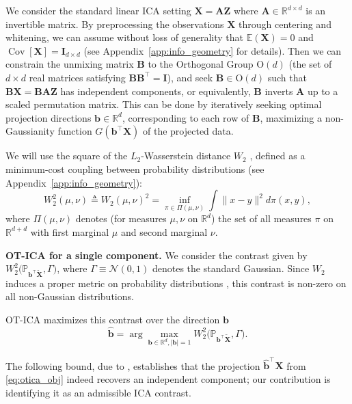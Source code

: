 \documentclass[accepted]{tpm2026} %
\newcommand{\Xb}{\mathbf{X}}
\newcommand{\Ab}{\mathbf{A}}
\newcommand{\Zb}{\mathbf{Z}}
\begin{document}
We consider the standard linear ICA setting $\Xb = \Ab\Zb$ where $\Ab\in \mathbb{R}^{d\times d}$ is an invertible matrix. By preprocessing the observations $\Xb$ through centering and whitening, we can assume without loss of generality that $\mathbb{E}(\mathbf{X})=0$ and $\operatorname{Cov}[{\mathbf{X}}] = \mathbf{I}_{d\times d}$ (see Appendix~\ref{app:info_geometry} for details). Then we can constrain the unmixing matrix $\mathbf{B}$ to the Orthogonal Group $\mathrm{O}(d)$ (the set of $d\times d$ real matrices satisfying $\mathbf{B}\mathbf{B}^\top = \mathbf{I}$), and seek $\mathbf{B}\in \mathrm{O}(d)$ such that $\mathbf{B}\Xb=\mathbf{B}\Ab\Zb$ has independent components, or equivalently, $\mathbf{B}$ inverts $\Ab$ up to a scaled permutation matrix. 
This can be done by iteratively seeking optimal projection directions
$\mathbf{b}\in\mathbb{R}^d$, corresponding to each row of
$\mathbf{B}$, maximizing a non-Gaussianity function $G(\mathbf{b}^\top \Xb)$ 
of the projected data. 

We will use the square of the $L_2$-Wasserstein distance $W_2$ \citep{villani2003}, 
defined as a minimum-cost coupling between probability distributions (see Appendix~\ref{app:info_geometry}):
\begin{equation}
    W_2^2(\mu, \nu) \!\triangleq\!W_2(\mu, \nu)^2\!=\!\!\!  \inf_{\pi \in \Pi(\mu, \nu)} \int\!\! \|x - y\|^2  d\pi(x, y) ,
\end{equation}
where $\Pi(\mu,\nu)$ denotes (for measures $\mu,\nu$ on $\mathbb{R}^d$) the set of all measures $\pi$ on $\mathbb{R}^{d+d}$ with first marginal $\mu$ and second marginal $\nu$.


\textbf{OT-ICA for a single component.}
We consider the contrast given by
$W_2^2\big(\mathbb{P}_{\mathbf{b}^\top \widetilde{\mathbf{X}}}, \Gamma\big)$, 
where $\Gamma \equiv \mathcal{N}(0,1)$ denotes the standard Gaussian.
Since  $W_2$ induces a proper metric on probability distributions \citep{villani2003}, this contrast  is non-zero on all non-Gaussian distributions.


OT-ICA maximizes this contrast over the direction $\mathbf{b}$
\begin{equation}
    \widehat{\mathbf{b}} = \arg\max_{\mathbf{b} \in \mathbb{R}^d, |\mathbf{b}|=1} W_2^2\big(\mathbb{P}_{\mathbf{b}^\top \widetilde{\mathbf{X}}}, \Gamma\big). \label{eq:otica_obj}
\end{equation}

The following bound, due to \citet{johnson2005central}, establishes that the projection $\widehat{\mathbf{b}}^\top \Xb$ from \eqref{eq:otica_obj} indeed recovers an independent component; our contribution is identifying it as an admissible ICA contrast.
\end{document}
